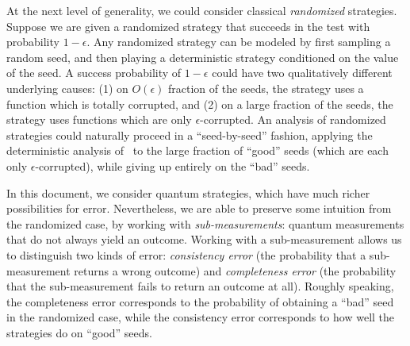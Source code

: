 \documentclass[11pt]{article}
\theoremstyle{definition}
\newcommand{\eps}{\epsilon}
\begin{document}
At the next level of generality, we could consider classical
\emph{randomized} strategies. Suppose we are given a randomized
strategy that succeeds in the test with probability $1 - \eps$. Any
randomized strategy can be modeled by first sampling a random seed,
and then playing a deterministic strategy conditioned on the value of
the seed. A success probability of $1 - \eps$ could have two
qualitatively different underlying causes: (1) on $O(\eps)$ fraction
of the seeds, the strategy uses a function which is totally corrupted,
and (2) on a large fraction of the seeds, the strategy uses functions
which are only $\eps$-corrupted. An analysis of randomized
strategies could naturally proceed in a ``seed-by-seed'' fashion, applying the
deterministic analysis of~\cite{BFL91} to the large fraction of ``good'' seeds (which
are each only $\eps$-corrupted), while giving up entirely on the
``bad'' seeds.

In this document, we consider quantum strategies, which
have much richer possibilities for error. Nevertheless, we are able to
preserve some intuition from the randomized case, by working with
\emph{sub-measurements}: quantum measurements that do not always yield
an outcome. Working with a sub-measurement allows us to distinguish two
kinds of error: \emph{consistency error} (the probability that a
sub-measurement returns a wrong outcome) and \emph{completeness error}
(the probability that the sub-measurement fails to return an outcome at
all). Roughly speaking, the completeness error corresponds to the
probability of obtaining a ``bad'' seed in the randomized case, while
the consistency error corresponds to how well the strategies do on
``good'' seeds.
\end{document}
